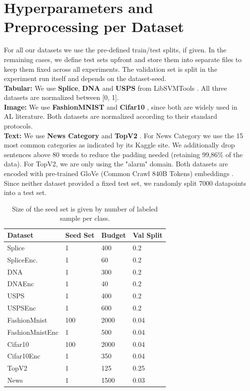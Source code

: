 \documentclass[]{article}
\begin{document}
\section{Hyperparameters and Preprocessing per Dataset}\label{app:hyperparameters}
For all our datasets we use the pre-defined train/test splits, if given. 
In the remaining cases, we define test sets upfront and store them into separate files to keep them fixed across all experiments.
The validation set is split in the experiment run itself and depends on the dataset-seed.\\
\textbf{Tabular:}
We use \textbf{Splice}, \textbf{DNA} and \textbf{USPS} from LibSVMTools \cite{libsvmtools}.
All three datasets are normalized between [0, 1]. \\
\textbf{Image:}
We use \textbf{FashionMNIST} \cite{xiao2017fashion} and \textbf{Cifar10} \cite{krizhevsky2009learning}, since both are widely used in AL literature.
Both datasets are normalized according to their standard protocols. \\
\textbf{Text:}
We use \textbf{News Category} \cite{misra2022news} and \textbf{TopV2} \cite{chen-etal-2020-low-resource}.
For News Category we use  the 15 most common categories as indicated by its Kaggle site.
We additionally drop sentences above 80 words to reduce the padding needed (retaining 99,86\% of the data).
For TopV2, we are only using the "alarm" domain.
Both datasets are encoded with pre-trained GloVe (Common Crawl 840B Tokens) embeddings \cite{pennington2014glove}.
Since neither dataset provided a fixed test set, we randomly split 7000 datapoints into a test set.
%
\begin{table}[H]
	\centering
	\begin{tabular}{l || l l l }
		Dataset & Seed Set & Budget & Val Split \\
		\hline
		Splice & 1 & 400 & 0.2 \\
		SpliceEnc. & 1 & 60 & 0.2 \\
		DNA & 1 & 300 & 0.2 \\
		DNAEnc & 1 & 40 & 0.2 \\
		USPS & 1 & 400 & 0.2 \\
		USPSEnc & 1 & 600 & 0.2 \\
		FashionMnist & 100 & 2000 & 0.04 \\
		FashionMnistEnc & 1 & 500 & 0.04 \\
		Cifar10 & 100 & 2000 & 0.04  \\
		Cifar10Enc & 1 & 350 & 0.04  \\
		TopV2 & 1 & 125 & 0.25  \\
		News & 1 & 1500 & 0.03  \\
	\end{tabular}
	\caption{Size of the seed set is given by number of labeled sample per class.}
	\label{tab:architecture_hps}
\end{table}
\end{document}
